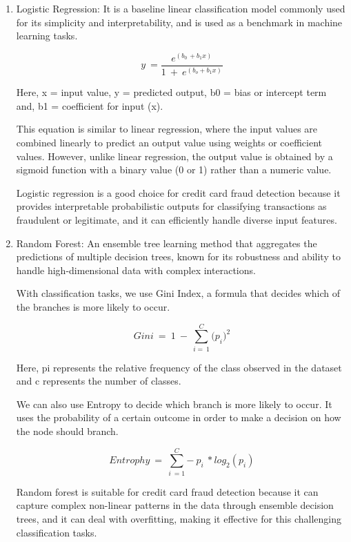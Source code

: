 \documentclass[pdflatex,sn-mathphys-num]{sn-jnl}%
\begin{document}
\begin{enumerate}[label=(\roman*),itemsep=10pt]
\item Logistic Regression: It is a baseline linear classification model commonly used for its simplicity and interpretability, and is used as a benchmark in machine learning tasks.

\begin{equation}
y\ =\frac{e^{\left(b_{0\ }+b_1x\right)}}{1\ +\ e^(b_o+b_1x)}
\end{equation}


Here, x = input value, y = predicted output, b0 = bias or intercept term and, b1 = coefficient for input (x).

This equation is similar to linear regression, where the input values are combined linearly to predict an output value using weights or coefficient values. However, unlike linear regression, the output value is obtained by a sigmoid function with a binary value (0 or 1) rather than a numeric value.

Logistic regression is a good choice for credit card fraud detection because it provides interpretable probabilistic outputs for classifying transactions as fraudulent or legitimate, and it can efficiently handle diverse input features. 

\item Random Forest: An ensemble tree learning method that aggregates the predictions of multiple decision trees, known for its robustness and ability to handle high-dimensional data with complex interactions.

With classification tasks, we use Gini Index, a formula that decides which of the branches is more likely to occur.

\begin{equation}
Gini\ =\ 1\ -\ \sum_{{i} =\ 1}^{C}{{(p}_i)}^2
\end{equation}

Here, pi represents the relative frequency of the class observed in the dataset and c represents the number of classes.

We can also use Entropy to decide which branch is more likely to occur. It uses the probability of a certain outcome in order to make a decision on how the node should branch. 

\begin{equation}
Entrophy\ =\ \sum_{{i}\ =1}^{C}{-\ p_{i}}\ \ast{log}_2(p_{i})  
\end{equation}

Random forest is suitable for credit card fraud detection because it can capture complex non-linear patterns in the data through ensemble decision trees, and it can deal with overfitting, making it effective for this challenging classification tasks.


\end{enumerate}
\end{document}
